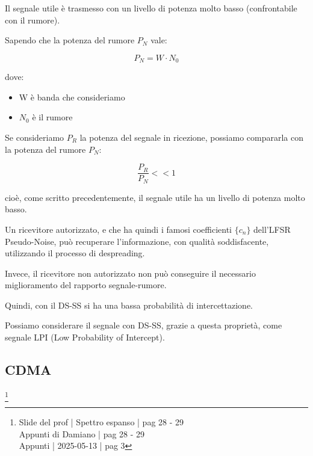 Il segnale utile è trasmesso con un livello di potenza molto basso (confrontabile con il rumore). \newline 

Sapendo che la potenza del rumore $P_N$ vale: 

{
    \Large 
    \begin{equation}
        P_N 
        = 
        W \cdot N_0
    \end{equation}
}

dove: 

\begin{itemize}
    \item W è banda che consideriamo 
    \item $N_0$ è il rumore
\end{itemize}

Se consideriamo $P_R$ la potenza del segnale in ricezione, 
possiamo compararla con la potenza del rumore $P_N$: 

{
    \Large 
    \begin{equation}
        \frac{P_R}{P_N}
        <<
        1
    \end{equation}
}

cioè, come scritto precedentemente, 
il segnale utile ha un livello di potenza molto basso. \newline 

Un ricevitore autorizzato, e che ha quindi i famosi coefficienti $\{ c_n\}$ dell'LFSR Pseudo-Noise, 
può recuperare l'informazione, 
con qualità soddisfacente, utilizzando il processo di despreading. \newline 

Invece, il ricevitore non autorizzato non può conseguire il necessario miglioramento del rapporto segnale-rumore. \newline 

Quindi, con il DS-SS si ha una bassa probabilità di intercettazione. \newline 

Possiamo considerare il segnale con DS-SS, grazie a questa proprietà, 
come segnale LPI (Low Probability of Intercept). \newline 

\newpage 

\subsection{CDMA}
\footnote{Slide del prof | Spettro espanso | pag 28 - 29\\
Appunti di Damiano | pag 28 - 29\\
Appunti | 2025-05-13 | pag 3 
} 

